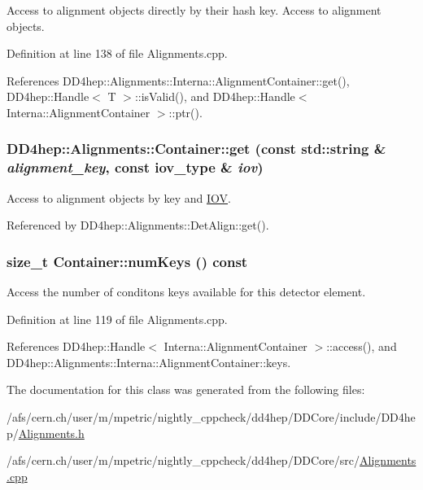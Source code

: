 Access to alignment objects directly by their hash key. Access to alignment objects. 

Definition at line 138 of file Alignments.cpp.

References DD4hep::Alignments::Interna::AlignmentContainer::get(), DD4hep::Handle$<$ T $>$::isValid(), and DD4hep::Handle$<$ Interna::AlignmentContainer $>$::ptr().\hypertarget{class_d_d4hep_1_1_alignments_1_1_container_a7a1e125b1ea376bc6a05a7a523418211}{
\subsubsection[{get}]{ DD4hep::Alignments::Container::get (const std::string \& {\em alignment\_\-key}, \/  const {\bf iov\_\-type} \& {\em iov})}}
\label{class_d_d4hep_1_1_alignments_1_1_container_a7a1e125b1ea376bc6a05a7a523418211}


Access to alignment objects by key and \hyperlink{class_d_d4hep_1_1_i_o_v}{IOV}. 

Referenced by DD4hep::Alignments::DetAlign::get().\hypertarget{class_d_d4hep_1_1_alignments_1_1_container_ad423d94cea1ea683a5279fea77ece42d}{
\subsubsection[{numKeys}]{\setlength{\rightskip}{0pt plus 5cm}size\_\-t Container::numKeys () const}}
\label{class_d_d4hep_1_1_alignments_1_1_container_ad423d94cea1ea683a5279fea77ece42d}


Access the number of conditons keys available for this detector element. 

Definition at line 119 of file Alignments.cpp.

References DD4hep::Handle$<$ Interna::AlignmentContainer $>$::access(), and DD4hep::Alignments::Interna::AlignmentContainer::keys.

The documentation for this class was generated from the following files:\begin{DoxyCompactItemize}
\item 
/afs/cern.ch/user/m/mpetric/nightly\_\-cppcheck/dd4hep/DDCore/include/DD4hep/\hyperlink{_alignments_8h}{Alignments.h}\item 
/afs/cern.ch/user/m/mpetric/nightly\_\-cppcheck/dd4hep/DDCore/src/\hyperlink{_alignments_8cpp}{Alignments.cpp}\end{DoxyCompactItemize}
